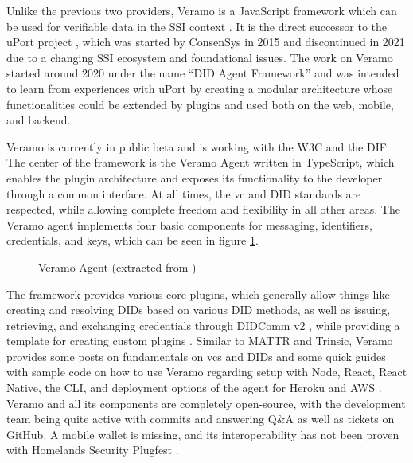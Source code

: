    Unlike the previous two providers, Veramo is a JavaScript framework which can be used for verifiable data in the SSI context \cite{veramo_veramo_2021-1}. It is the direct successor to the uPort project \cite{uport_uport_2021}, which was started by ConsenSys in 2015 and discontinued in 2021 due to a changing SSI ecosystem and foundational issues. The work on Veramo started around 2020 under the name “DID Agent Framework” and was intended to learn from experiences with uPort by creating a modular architecture whose functionalities could be extended by plugins and used both on the web, mobile, and backend. \cite{uport_veramo_2021}
    
    Veramo is currently in public beta and is working with the W3C and the DIF \cite{veramo_veramo_2021-1}. The center of the framework is the Veramo Agent written in TypeScript, which enables the plugin architecture and exposes its functionality to the developer through a common interface. At all times, the \ac{vc} and \ac{DID} standards are respected, while allowing complete freedom and flexibility in all other areas. The Veramo agent implements four basic components for messaging, identifiers, credentials, and keys, which can be seen in figure \ref{figure: veramo agent}. \cite{veramo_veramo_2021-2}
    
    \begin{figure}[ht]
	    \centering    	    \makebox[\textwidth]{}
        \caption{Veramo Agent (extracted from \cite{veramo_veramo_2021-2})}
        \label{figure: veramo agent}
    \end{figure}
    
    The framework provides various core plugins, which generally allow things like creating and resolving \acp{DID} based on various \ac{DID} methods, as well as issuing, retrieving, and exchanging credentials through DIDComm v2 \cite{veramo_veramo_2021-2, veramo_blog_2021}, while providing a template for creating custom plugins \cite{veramo_uport-projectveramo-plugin_2021}. Similar to MATTR and Trinsic, Veramo provides some posts on fundamentals on \acp{vc} and \acp{DID} and some quick guides with sample code on how to use Veramo regarding setup with Node, React, React Native, the CLI, and deployment options of the agent for Heroku and AWS \cite{veramo_veramo_2021-2}. Veramo and all its components are completely open-source, with the development team being quite active with commits and answering Q\&A as well as tickets on GitHub. A mobile wallet is missing, and its interoperability has not been proven \cite{homeland_security_interoperability_2021} with Homelands Security Plugfest .
    
